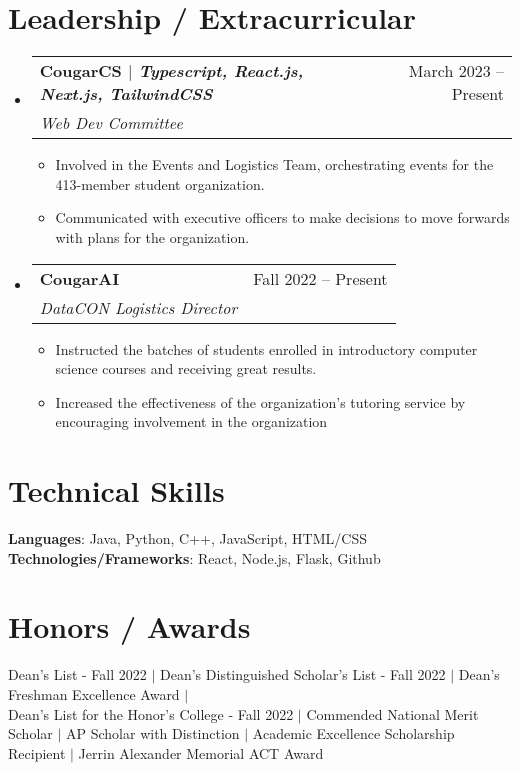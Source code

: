 \documentclass[letterpaper,11pt]{article}
\makeatletter
\newcommand{\resumeItem}[1]{
  \item\small{
    {#1 \vspace{-2pt}}
  }
}
\newcommand{\resumeSubheading}[4]{
  \vspace{-2pt}\item
    \begin{tabular*}{0.97\textwidth}[t]{l@{\extracolsep{\fill}}r}
      \textbf{#1} & #2 \\
      \textit{\small#3} & \textit{\small #4} \\
    \end{tabular*}\vspace{-7pt}
}
\newcommand{\resumeSubHeadingListStart}{\begin{itemize}[leftmargin=0.15in, label={}]}
\newcommand{\resumeSubHeadingListEnd}{\end{itemize}}
\newcommand{\resumeItemListStart}{\begin{itemize}}
\newcommand{\resumeItemListEnd}{\end{itemize}\vspace{-5pt}}
\makeatother
\begin{document}
\section{Leadership / Extracurricular}
    \resumeSubHeadingListStart
        \resumeSubheading{CougarCS $|$ \emph{Typescript, React.js, Next.js, TailwindCSS}}{March 2023 -- Present}{Web Dev Committee}{}
            \resumeItemListStart
                \resumeItem{Involved in the Events and Logistics Team, orchestrating events for the 413-member student organization.}
                \resumeItem{Communicated with executive officers to make decisions to move forwards with plans for the organization.}
            \resumeItemListEnd
            \resumeSubheading{CougarAI}{Fall 2022 -- Present}{DataCON Logistics Director}{}
            \resumeItemListStart
                \resumeItem{Instructed the batches of students enrolled in introductory computer science courses and receiving great results.}
                \resumeItem{Increased the effectiveness of the organization's tutoring service by encouraging involvement in the organization}
            \resumeItemListEnd
        
    \resumeSubHeadingListEnd


%
\section{Technical Skills}
 \begin{itemize}[leftmargin=0.15in, label={}]
    \small{\item{
     \textbf{Languages}{: Java, Python, C++, JavaScript, HTML/CSS} \\
     \textbf{Technologies/Frameworks}{: React, Node.js, Flask, Github}
    }}
 \end{itemize}

 \section{Honors / Awards}
 \begin{itemize}[leftmargin=0.15in, label={}]
    \small{\item{
     \textbf{}{Dean’s List - Fall 2022 $|$ Dean’s Distinguished Scholar’s List - Fall 2022 $|$ Dean’s Freshman Excellence Award $|$ \\Dean’s List for  the Honor’s College - Fall 2022 $|$ Commended National Merit Scholar $|$ AP Scholar with Distinction $|$ Academic Excellence Scholarship Recipient $|$ Jerrin Alexander Memorial ACT Award}{} \\
    }}
 \end{itemize}


\end{document}
